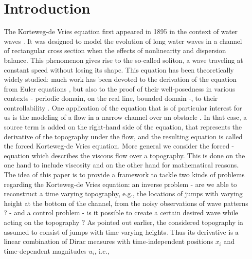 
\section{Introduction}

The Korteweg-de Vries equation first appeared in 1895 in the context of water waves \cite{korteweg1895xli}. It was designed to model the evolution of long water waves in a channel of rectangular cross section when the effects of nonlinearity and dispersion balance. This phenomenon gives rise to the so-called soliton, a wave traveling at constant speed without losing its shape. This equation has been theoretically widely studied: much work has been devoted to the derivation of the equation from Euler equations \cite{shen1992forced,constantin2008,su2003korteweg}, but also to the proof of their well-posedness in various contexts \cite{miura1976korteweg,kenig1993,bourgain1997periodic} - periodic domain, on the real line, bounded domain -, to their controllability \cite{rosier1997exact,glass2008some,coron2003exact,chapouly2009global}.
One application of the \KdV equation that is of particular interest for us is the modeling of a flow in a narrow channel over an obstacle \cite{milewski2004forced,shen1992forced,shen1996accuracy}. %
In that case, a source term is added on the right-hand side of the \KdV equation, that represents the derivative of the topography under the flow, and the resulting equation is called the forced Korteweg-de Vries equation. More general we consider the forced \KdVB-equation which describes the viscous flow over a topography. This is done on the one hand to include viscosity and on the other hand for mathematical reasons.      %
The idea of this paper is to provide a framework to tackle two kinds of problems regarding the Korteweg-de Vries equation: an inverse problem - are we able to reconstruct a time varying topography, e.g., the locations of jumps with varying height at the bottom of the channel, from the noisy observations of wave patterns ? -  and a control problem - is it possible to create a certain desired wave while acting on the topography ? As pointed out earlier, the considered topography ia assumed to consist of jumps with time varying heights. Thus its derivative is a linear combination of Dirac measures with time-independent positions $x_i$ and time-dependent magnitudes $u_i$, i.e.,
